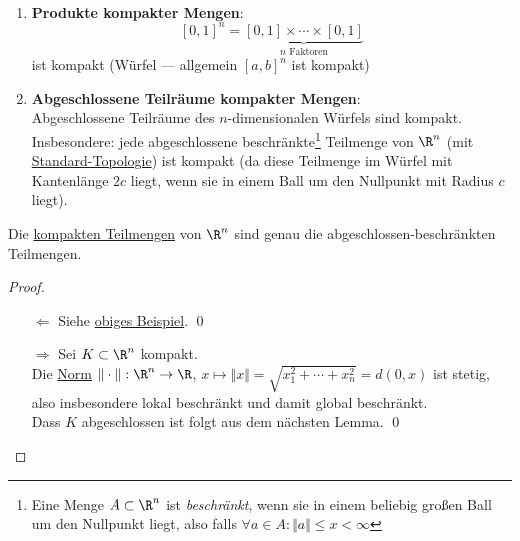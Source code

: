 \begin{example}
  \
  \begin{enumerate}
    \item \textbf{Produkte kompakter Mengen}:
      \begin{equation*}
        {[0,1]}^n = \underbrace{[0,1] \times \cdots \times [0,1]}_{n \text{ Faktoren}}
      \end{equation*}
      ist kompakt (Würfel --- allgemein \( {[a,b]}^n \) ist kompakt) 
    \item \textbf{Abgeschlossene Teilräume kompakter Mengen}\label{bsp:abgeschlosseneTRkompakterMengen}: \\
      Abgeschlossene Teilräume des \( n \)-dimensionalen Würfels sind kompakt. Insbesondere: jede abgeschlossene beschränkte\footnote{Eine Menge \( A \subset \R^n \) ist \emph{beschränkt}, wenn sie in einem beliebig großen Ball um den Nullpunkt liegt, also falls \( \forall a \in A : \Vert a \Vert \leq x < \infty \)} Teilmenge von \( \R^n \) (mit \hyperref[bsp:standardtopologie]{Standard-Topologie}) ist kompakt (da diese Teilmenge im Würfel mit Kantenlänge \( 2c \) liegt, wenn sie in einem Ball um den Nullpunkt mit Radius \( c \) liegt).
  \end{enumerate}
\end{example}

\begin{theorem}
  Die \hyperref[def:kompakt]{kompakten Teilmengen} von \( \R^n \) sind genau die abgeschlossen-beschränkten Teilmengen.
  \begin{proof}
    \
    \begin{itemize}
      \item[\( \Leftarrow \)] Siehe \hyperref[bsp:abgeschlosseneTRkompakterMengen]{obiges Beispiel}. \qed{}
      \item[\( \Rightarrow \)] Sei \( K \subset \R^n \) kompakt. \\
        Die \hyperref[bsp:norm]{Norm} \( \Vert \cdot \Vert : \R^n \to \R \), \( x \mapsto \Vert x \Vert = \sqrt{x_1^2 + \cdots + x_n^2} = d(0,x) \) ist stetig, also insbesondere lokal beschränkt und damit global beschränkt. \\
        Dass \( K \) abgeschlossen ist folgt aus dem nächsten Lemma. \qed{}
    \end{itemize}
  \end{proof}
\end{theorem}

